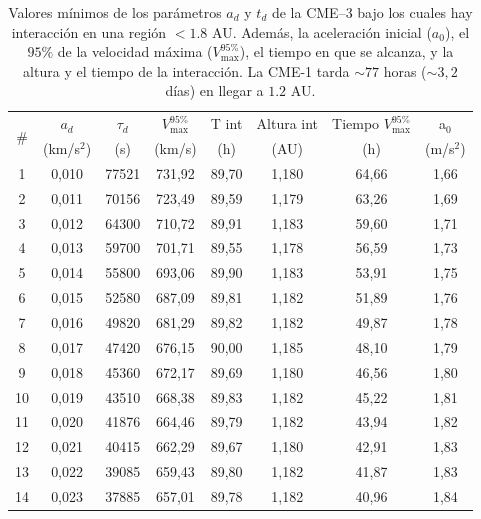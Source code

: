 \begin{table}[h]
    \centering
    \footnotesize
    \begin{threeparttable}
        \caption[Valores mínimos de los parámetros $a_d$ y $t_d$ de la CME--3 bajo los cuales hay interacción]{Valores mínimos de los parámetros $a_d$ y $t_d$ de la CME--3 bajo los cuales hay interacción en una región $<1.8$ AU. Además, la aceleración inicial ($a_0$), el $95\%$ de la velocidad máxima ($V_{\text{max}}^{95\%}$), el tiempo en que se alcanza, y la altura y el tiempo de la interacción. La CME-1 tarda $\sim 77$ horas ($\sim 3,2$ días) en llegar a $1.2$ AU.}
        \label{tab:parametros_decaimiento2}
        \begin{tabular}{@{}c c c c c c c c@{}}
            \toprule
            \multirow{2}{*}{\#} & $a_d$ & $\tau_d$ & $V_{\text{max}}^{95\%}$ & T int & Altura int & Tiempo $V_{\text{max}}^{95\%}$ & a$_0$ \\
             & (km/s$^2$) & (s) & (km/s) & (h) & (AU) & (h) & (m/s$^2$) \\
            \midrule
            1  & 0,010 & 77521 & 731,92 & 89,70 & 1,180 & 64,66 & 1,66\\
            2  & 0,011 & 70156 & 723,49 & 89,59 & 1,179 & 63,26 & 1,69\\
            3  & 0,012 & 64300 & 710,72 & 89,91 & 1,183 & 59,60 & 1,71\\
            4  & 0,013 & 59700 & 701,71 & 89,55 & 1,178 & 56,59 & 1,73\\
            5  & 0,014 & 55800 & 693,06 & 89,90 & 1,183 & 53,91 & 1,75\\
            6  & 0,015 & 52580 & 687,09 & 89,81 & 1,182 & 51,89 & 1,76\\
            7  & 0,016 & 49820 & 681,29 & 89,82 & 1,182 & 49,87 & 1,78\\
            8  & 0,017 & 47420 & 676,15 & 90,00 & 1,185 & 48,10 & 1,79\\
            9  & 0,018 & 45360 & 672,17 & 89,69 & 1,180 & 46,56 & 1,80\\
            10 & 0,019 & 43510 & 668,38 & 89,83 & 1,182 & 45,22 & 1,81\\
            11 & 0,020 & 41876 & 664,46 & 89,79 & 1,182 & 43,94 & 1,82\\
            12 & 0,021 & 40415 & 662,29 & 89,67 & 1,180 & 42,91 & 1,83\\
            13 & 0,022 & 39085 & 659,43 & 89,80 & 1,182 & 41,87 & 1,83\\
            14 & 0,023 & 37885 & 657,01 & 89,78 & 1,182 & 40,96 & 1,84\\

\end{tabular}
\end{threeparttable}
\end{table}
